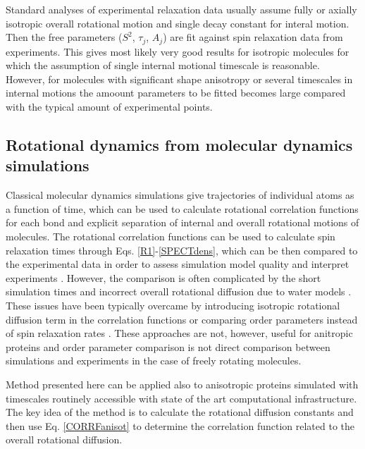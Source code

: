 \documentclass[pre,aps,floatfix,authordate1-4,twocolumn]{revtex4-1}
\begin{document}
Standard analyses of experimental relaxation data usually assume
fully or axially isotropic overall rotational motion and single
decay constant for interal motion. Then the free parameters
($S^2$, $\tau_j$, $A_j$) are fit against spin relaxation data
from experiments. This gives most likely very good results for
isotropic molecules for which the assumption of single internal
motional timescale is reasonable. However, for molecules with
significant shape anisotropy or several timescales in internal
motions the amoount parameters to be fitted becomes large compared
with the typical amount of experimental points.

\subsection{Rotational dynamics from molecular dynamics simulations}\label{MDanalysis}
Classical molecular dynamics simulations give trajectories of individual
atoms as a function of time, which can be used to calculate rotational
correlation functions for each bond and explicit separation of internal
and overall rotational motions of molecules. The rotational
correlation functions can be used to calculate spin relaxation times
through Eqs. \ref{R1}-\ref{SPECTdens}, which can be then compared to the
experimental data in order to assess simulation model quality \cite{??} and interpret
experiments \cite{??}. However, the comparison is often complicated by
the short simulation times \cite{??} and incorrect overall rotational
diffusion due to water models \cite{??}. These issues have been typically
overcame by introducing isotropic rotational diffusion term in the correlation
functions \cite{??} or comparing order parameters instead of spin relaxation rates \cite{??}.
These approaches are not, however, useful for anitropic proteins and order
parameter comparison is not direct comparison between simulations and experiments in
the case of freely rotating molecules. 

Method presented here can be applied also to anisotropic proteins simulated
with timescales routinely accessible with state of the art computational
infrastructure. The key idea of the method is to calculate the rotational
diffusion constants and then use Eq. \ref{CORRFanisot} to determine the
correlation function related to the overall rotational diffusion. 
\end{document}
